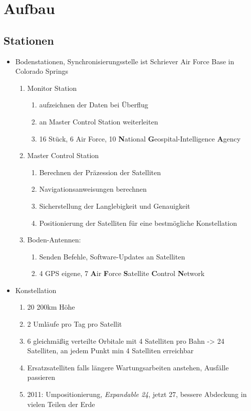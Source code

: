 \section{Aufbau}
\label{sec:aufbau}

\subsection{Stationen}
\begin{itemize}
    \item Bodenstationen, Synchronisierungsstelle ist Schriever Air Force Base in Colorado Springs
    \begin{enumerate}
        \item Monitor Station
        \begin{enumerate}
            \item aufzeichnen der Daten bei Überflug
            \item an Master Control Station weiterleiten
            \item 16 Stück, 6 Air Force, 10 \textbf{N}ational \textbf{G}eospital-Intelligence \textbf{A}gency
        \end{enumerate}
        \item Master Control Station
        \begin{enumerate}
            \item Berechnen der Präzession der Satelliten
            \item Navigationsanweisungen berechnen
            \item Sicherstellung der Langlebigkeit und Genauigkeit
            \item Positionierung der Satelliten für eine bestmögliche Konstellation
        \end{enumerate}
        \item Boden-Antennen:
        \begin{enumerate}
            \item Senden Befehle, Software-Updates an Satelliten
            \item 4 GPS eigene, 7 \textbf{A}ir \textbf{F}orce \textbf{S}atellite \textbf{C}ontrol \textbf{N}etwork
        \end{enumerate}
    \end{enumerate}
    \item Konstellation
    \begin{enumerate}
        \item 20 200km Höhe
        \item 2 Umläufe pro Tag pro Satellit
        \item 6 gleichmäßig verteilte Orbitale mit 4 Satelliten pro Bahn -> 24 Satelliten, an jedem Punkt min 4 Satelliten erreichbar
        \item Ersatzsatelliten falls längere Wartungsarbeiten anstehen, Ausfälle passieren
        \item 2011: Umpositionierung, \textit{Expandable 24}, jetzt 27, bessere Abdeckung in vielen Teilen der Erde
    \end{enumerate}
\end{itemize}


